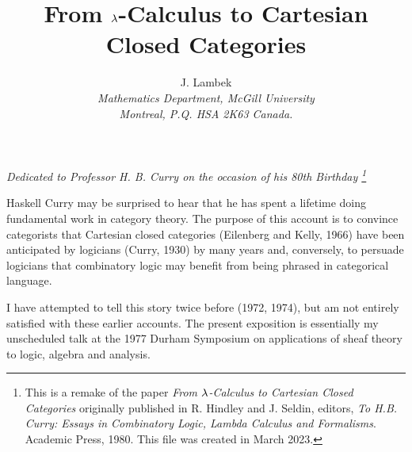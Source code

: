 \makeatletter
\DeclareRobustCommand{\eqx}{\mathrel{\mathpalette\eq@{x}}}
\DeclareRobustCommand{\eqy}{\mathrel{\mathpalette\eq@{y}}}
\newcommand{\eq@}[2]{%
  \vtop{\offinterlineskip
    \ialign{\hfil##\hfil\cr
      $\m@th#1=$\cr %
      \noalign{\sbox\z@{$\m@th#1\mkern0mu$}\kern-\wd\z@}
      $\m@th\alexey@demote{#1}#2$\cr
    }%
  }%
}
\newcommand{\alexey@demote}[1]{%
  \ifx#1\displaystyle\scriptstyle\else
  \ifx#1\textstyle\scriptstyle\else
  \scriptscriptstyle\fi\fi
}
\usepackage[symbol]{footmisc}

\renewcommand{\thefootnote}{\fnsymbol{footnote}}

\newcommand*\dotop{\mathpalette\bigcdot@{.6}}
\newcommand*\bigcdot@[2]{\mathbin{\vcenter{\hbox{\scalebox{#2}{$\m@th#1\bullet$}}}}}
\makeatother

\title{\large From $\lambda$-Calculus to Cartesian Closed Categories}
\author{\normalsize J. Lambek \\
{\small\it Mathematics Department, McGill University} \\
{\small\it Montreal, P.Q. HSA 2K63 Canada.}}

\maketitle
{\centerline
{\small\it Dedicated to Professor H. B. Curry on the occasion of his 80th Birthday
%
\footnote{ This is a remake of the paper {\it From $\lambda$-Calculus to Cartesian Closed
Categories} originally published in R. Hindley and J. Seldin, editors, {\it To H.B. Curry:
Essays in Combinatory Logic, Lambda Calculus and Formalisms}. Academic Press, 1980. This
file was created in March 2023.}}} \bigskip\bigskip

\noindent
Haskell Curry may be surprised to hear that he has spent a lifetime doing fundamental work
in category theory. The purpose of this account is to convince categorists that Cartesian
closed categories (Eilenberg and Kelly, 1966) have been anticipated by logicians (Curry,
1930) by many years and, conversely, to persuade logicians that combinatory logic may
benefit from being phrased in categorical language.

I have attempted to tell this story twice before (1972, 1974), but am not entirely
satisfied with these earlier accounts. The present exposition is essentially my
unscheduled talk at the 1977 Durham Symposium on applications of sheaf theory to logic,
algebra and analysis.

